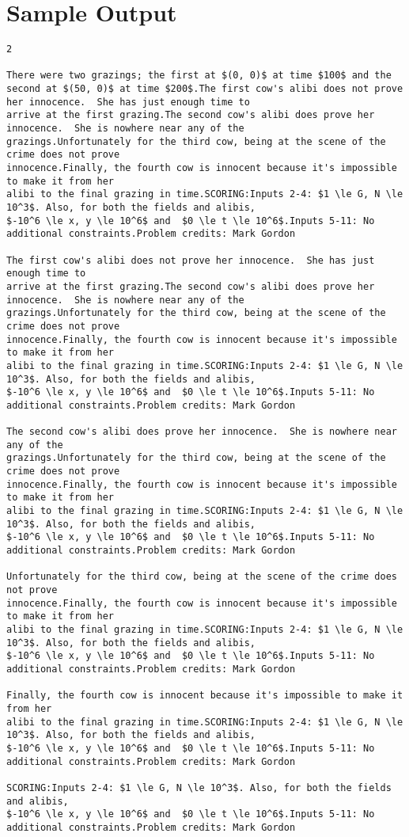 \documentclass[12pt]{article}
\begin{document}
\section*{Sample Output}
\begin{verbatim}
2

There were two grazings; the first at $(0, 0)$ at time $100$ and the
second at $(50, 0)$ at time $200$.The first cow's alibi does not prove her innocence.  She has just enough time to
arrive at the first grazing.The second cow's alibi does prove her innocence.  She is nowhere near any of the
grazings.Unfortunately for the third cow, being at the scene of the crime does not prove
innocence.Finally, the fourth cow is innocent because it's impossible to make it from her
alibi to the final grazing in time.SCORING:Inputs 2-4: $1 \le G, N \le 10^3$. Also, for both the fields and alibis,
$-10^6 \le x, y \le 10^6$ and  $0 \le t \le 10^6$.Inputs 5-11: No additional constraints.Problem credits: Mark Gordon

The first cow's alibi does not prove her innocence.  She has just enough time to
arrive at the first grazing.The second cow's alibi does prove her innocence.  She is nowhere near any of the
grazings.Unfortunately for the third cow, being at the scene of the crime does not prove
innocence.Finally, the fourth cow is innocent because it's impossible to make it from her
alibi to the final grazing in time.SCORING:Inputs 2-4: $1 \le G, N \le 10^3$. Also, for both the fields and alibis,
$-10^6 \le x, y \le 10^6$ and  $0 \le t \le 10^6$.Inputs 5-11: No additional constraints.Problem credits: Mark Gordon

The second cow's alibi does prove her innocence.  She is nowhere near any of the
grazings.Unfortunately for the third cow, being at the scene of the crime does not prove
innocence.Finally, the fourth cow is innocent because it's impossible to make it from her
alibi to the final grazing in time.SCORING:Inputs 2-4: $1 \le G, N \le 10^3$. Also, for both the fields and alibis,
$-10^6 \le x, y \le 10^6$ and  $0 \le t \le 10^6$.Inputs 5-11: No additional constraints.Problem credits: Mark Gordon

Unfortunately for the third cow, being at the scene of the crime does not prove
innocence.Finally, the fourth cow is innocent because it's impossible to make it from her
alibi to the final grazing in time.SCORING:Inputs 2-4: $1 \le G, N \le 10^3$. Also, for both the fields and alibis,
$-10^6 \le x, y \le 10^6$ and  $0 \le t \le 10^6$.Inputs 5-11: No additional constraints.Problem credits: Mark Gordon

Finally, the fourth cow is innocent because it's impossible to make it from her
alibi to the final grazing in time.SCORING:Inputs 2-4: $1 \le G, N \le 10^3$. Also, for both the fields and alibis,
$-10^6 \le x, y \le 10^6$ and  $0 \le t \le 10^6$.Inputs 5-11: No additional constraints.Problem credits: Mark Gordon

SCORING:Inputs 2-4: $1 \le G, N \le 10^3$. Also, for both the fields and alibis,
$-10^6 \le x, y \le 10^6$ and  $0 \le t \le 10^6$.Inputs 5-11: No additional constraints.Problem credits: Mark Gordon
\end{verbatim}
\end{document}
